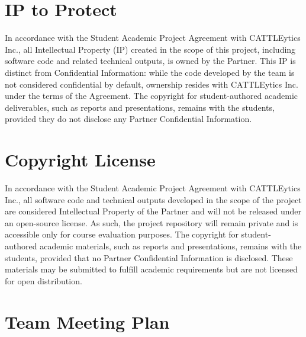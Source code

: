 \documentclass{article}
\begin{document}
\section{IP to Protect}
In accordance with the Student Academic Project Agreement with CATTLEytics Inc., all Intellectual Property (IP) created 
in the scope of this project, including software code and related technical outputs, is owned by the Partner. 
This IP is distinct from Confidential Information: while the code developed by the team is not considered confidential 
by default, ownership resides with CATTLEytics Inc. under the terms of the Agreement. 
The copyright for student-authored academic deliverables, such as reports and presentations, remains with the students, 
provided they do not disclose any Partner Confidential Information.


\section{Copyright License}
In accordance with the Student Academic Project Agreement with CATTLEytics Inc., 
all software code and technical outputs developed in the scope of the project are considered 
Intellectual Property of the Partner and will not be released under an open-source license. 
As such, the project repository will remain private and is accessible only for course evaluation purposes. 
The copyright for student-authored academic materials, such as reports and presentations, remains with the students, 
provided that no Partner Confidential Information is disclosed. 
These materials may be submitted to fulfill academic requirements but are not licensed for open distribution.



\section{Team Meeting Plan}



\end{document}
